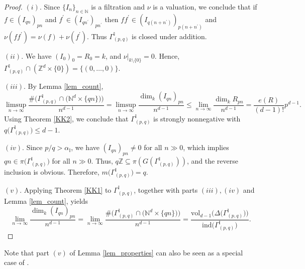 \documentclass[12pt,a4paper]{amsart}
\theoremstyle{plain}
\theoremstyle{definition}
\numberwithin{equation}{theorem}
\begin{document}
\begin{proof}
\emph{$(i)$}. Since $\{I_n\}_{n\in\mathbb{N}}$ is a filtration and $\nu$ is a valuation, we conclude that if $f\in {\left(I_{qn}\right)}_{pn}$ and $f^{\prime}\in {\left(I_{qn^{\prime}}\right)}_{pn^{\prime}}$ then $ff^{\prime} \in {\left(I_{q(n+n^{\prime})}\right)}_{p(n+n^{\prime})}$ and $\nu(ff^{\prime}) = \nu(f) + \nu(f^{\prime})$. Thus $\Gamma^{\mathbb{I}}_{(p,q)}$ is closed under addition.

\vspace{0.2cm}
\noindent
\emph{$(ii)$}. We have ${\left(I_{0}\right)}_{0}= R_0 = k$, and $\left. \nu\right|_{k\setminus \{0\}} = 0$. Hence, $\Gamma^{\mathbb{I}}_{(p,q)} \cap \left(\mathbb{Z}^d \times \{0\}\right) = \{(0,\ldots,0)\}$.

\vspace{0.2cm}
\noindent
\emph{$(iii)$}. By Lemma \ref{lem_count}, $$\limsup_{n\to\infty}\dfrac{\#\big(\Gamma^{\mathbb{I}}_{(p,q)} \cap \big(\mathbb{N}^d\times \{qn\}\big)\big)}{n^{d-1}} = \limsup_{n\to\infty}\dfrac{\dim_k {\left(I_{qn}\right)}_{pn}}{n^{d-1}} \leq \lim_{n\to\infty}\dfrac{\dim_k {R}_{pn}}{n^{d-1}} = \frac{e(R)}{(d-1)!}p^{d-1}.$$ Using Theorem \ref{KK2}, we conclude that $\Gamma^{\mathbb{I}}_{(p,q)}$ is strongly nonnegative with $q\big(\Gamma^{\mathbb{I}}_{(p,q)}\big)\leq d-1$.

\vspace{0.2cm}
\noindent
\emph{$(iv)$}. Since $p/q>\alpha_{\mathbb{I}}$, we have ${\left(I_{qn}\right)}_{pn}\neq 0$ for all $n\gg 0$, which implies $qn \in \pi\big(\Gamma^{\mathbb{I}}_{(p,q)}\big)$ for all $n\gg 0$. Thus, $q\mathbb{Z}\subseteq \pi(G(\Gamma^{\mathbb{I}}_{(p,q)}))$, and the reverse inclusion is obvious. Therefore, $m\big(\Gamma^{\mathbb{I}}_{(p,q)}\big)=q$.

\vspace{0.2cm}
\noindent
\emph{$(v)$}. Applying Theorem \ref{KK1} to $\Gamma^{\mathbb{I}}_{(p,q)}$, together with parts $(iii), (iv)$ and Lemma \ref{lem_count}, yields $$\lim_{n\to\infty}\dfrac{\dim_k {\left(I_{qn}\right)}_{pn}}{n^{d-1}} = \lim_{n\to\infty}\dfrac{\#\big(\Gamma^{\mathbb{I}}_{(p,q)} \cap \big(\mathbb{N}^d\times \{qn\}\big)\big)}{n^{d-1}} = \dfrac{\mathrm{vol}_{d-1}\big(\Delta\big(\Gamma^{\mathbb{I}}_{(p,q)}\big)\big)}{\mathrm{ind}\big(\Gamma^{\mathbb{I}}_{(p,q)}\big)}.$$
\end{proof}

Note that part $(v)$ of Lemma \ref{lem_properties} can also be seen as a special case of \cite[Theorem 4]{Das21}.
\end{document}

